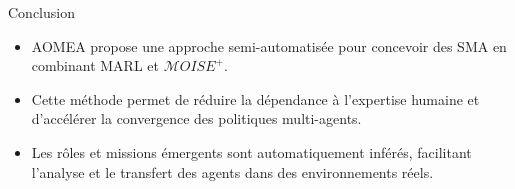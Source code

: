 \documentclass{beamer}
\begin{document}
\begin{frame}{Conclusion}
    \begin{itemize}
        \item AOMEA propose une approche semi-automatisée pour concevoir des SMA en combinant MARL et $\mathcal{M}OISE^+$.
        \item Cette méthode permet de réduire la dépendance à l'expertise humaine et d'accélérer la convergence des politiques multi-agents.
        \item Les rôles et missions émergents sont automatiquement inférés, facilitant l'analyse et le transfert des agents dans des environnements réels.
    \end{itemize}
\end{frame}
\end{document}
